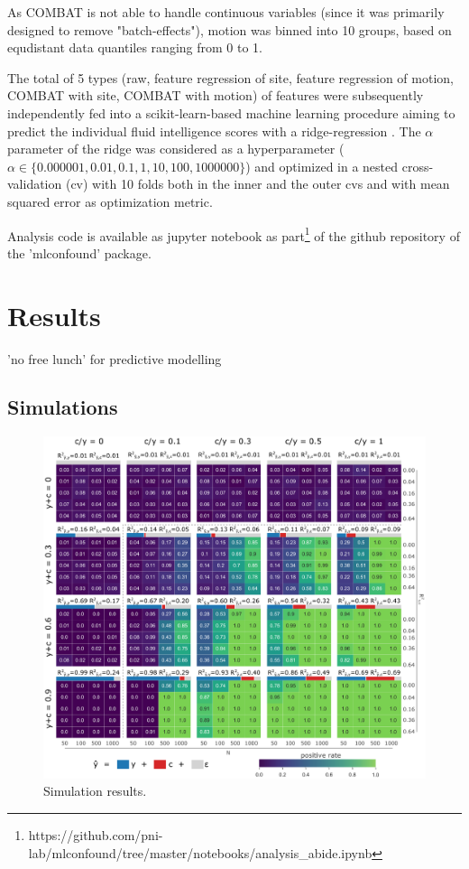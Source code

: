\documentclass{article}
\begin{document}
As COMBAT is not able to handle continuous variables (since it was primarily designed to remove "batch-effects"), motion was binned into 10 groups, based on equdistant data quantiles ranging from 0 to 1.

The total of 5 types (raw, feature regression of site, feature regression of motion, COMBAT with site, COMBAT with motion) of features were subsequently independently fed into a scikit-learn-based \citep{pedregosa2011scikit} machine learning procedure aiming to predict the individual fluid intelligence scores with a ridge-regression \citep{hoerl1970ridge}. The $\alpha$ parameter of the ridge was considered as a hyperparameter ($\alpha \in \{0.000001, 0.01, 0.1, 1, 10, 100, 1000000\}$) and optimized in a nested cross-validation (cv) with 10 folds both in the inner and the outer cvs and with mean squared error as optimization metric.

Analysis code is available as jupyter notebook as part\footnote{https://github.com/pni-lab/mlconfound/tree/master/notebooks/analysis\_abide.ipynb} of the github repository of the 'mlconfound' package.

\section{Results}

'no free lunch' for predictive modelling

\subsection{Simulations}

\begin{figure}
  \centering
  \includegraphics[width=0.75\paperwidth]{fig/sim_normal.eps}
  \caption{Simulation results.}
  \label{fig:hcp}
\end{figure}
\end{document}
